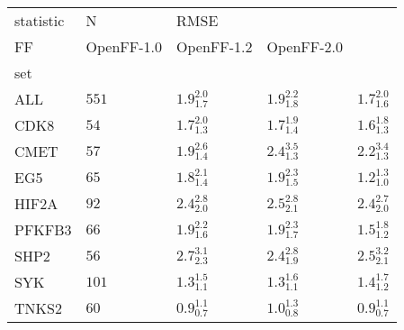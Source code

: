 \begin{tabular}{lllll}
\toprule
statistic &      N & \multicolumn{3}{l}{RMSE} \\
FF &         OpenFF-1.0 &         OpenFF-1.2 &         OpenFF-2.0 \\
set    &        &                    &                    &                    \\
\midrule
ALL    &  $551$ &  $1.9_{1.7}^{2.0}$ &  $1.9_{1.8}^{2.2}$ &  $1.7_{1.6}^{2.0}$ \\
CDK8   &   $54$ &  $1.7_{1.3}^{2.0}$ &  $1.7_{1.4}^{1.9}$ &  $1.6_{1.3}^{1.8}$ \\
CMET   &   $57$ &  $1.9_{1.4}^{2.6}$ &  $2.4_{1.3}^{3.5}$ &  $2.2_{1.3}^{3.4}$ \\
EG5    &   $65$ &  $1.8_{1.4}^{2.1}$ &  $1.9_{1.5}^{2.3}$ &  $1.2_{1.0}^{1.3}$ \\
HIF2A  &   $92$ &  $2.4_{2.0}^{2.8}$ &  $2.5_{2.1}^{2.8}$ &  $2.4_{2.0}^{2.7}$ \\
PFKFB3 &   $66$ &  $1.9_{1.6}^{2.2}$ &  $1.9_{1.7}^{2.3}$ &  $1.5_{1.2}^{1.8}$ \\
SHP2   &   $56$ &  $2.7_{2.3}^{3.1}$ &  $2.4_{1.9}^{2.8}$ &  $2.5_{2.1}^{3.2}$ \\
SYK    &  $101$ &  $1.3_{1.1}^{1.5}$ &  $1.3_{1.1}^{1.6}$ &  $1.4_{1.2}^{1.7}$ \\
TNKS2  &   $60$ &  $0.9_{0.7}^{1.1}$ &  $1.0_{0.8}^{1.3}$ &  $0.9_{0.7}^{1.1}$ \\
\bottomrule
\end{tabular}
